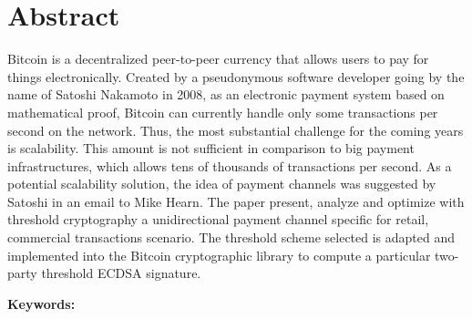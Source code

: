 \chapter*{Abstract}

Bitcoin is a decentralized peer-to-peer currency that allows users to pay for
things electronically. Created by a pseudonymous software developer going by the
name of Satoshi Nakamoto in 2008, as an electronic payment system based on
mathematical proof, Bitcoin can currently handle only some transactions per
second on the network. Thus, the most substantial challenge for the coming years
is scalability. This amount is not sufficient in comparison to big payment
infrastructures, which allows tens of thousands of transactions per second. As a
potential scalability solution, the idea of payment channels was suggested by
Satoshi in an email to Mike Hearn. The paper present, analyze and optimize with
threshold cryptography a unidirectional payment channel specific for retail,
commercial transactions scenario. The threshold scheme selected is adapted and
implemented into the Bitcoin cryptographic library to compute a particular
two-party threshold ECDSA signature.

\vskip0.5cm
\noindent\textbf{Keywords:}
\Keywords

